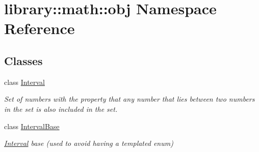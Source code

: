 \hypertarget{namespacelibrary_1_1math_1_1obj}{}\section{library\+:\+:math\+:\+:obj Namespace Reference}
\label{namespacelibrary_1_1math_1_1obj}
\subsection*{Classes}
\begin{DoxyCompactItemize}
\item 
class \hyperlink{classlibrary_1_1math_1_1obj_1_1_interval}{Interval}
\begin{DoxyCompactList}\small\item\em Set of numbers with the property that any number that lies between two numbers in the set is also included in the set. \end{DoxyCompactList}\item 
class \hyperlink{classlibrary_1_1math_1_1obj_1_1_interval_base}{Interval\+Base}
\begin{DoxyCompactList}\small\item\em \hyperlink{classlibrary_1_1math_1_1obj_1_1_interval}{Interval} base (used to avoid having a templated enum) \end{DoxyCompactList}\end{DoxyCompactItemize}
